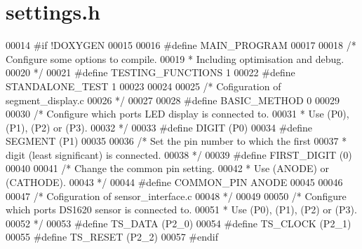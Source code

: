 \section{settings.h}

\begin{DoxyCode}
00014 \textcolor{preprocessor}{#if !DOXYGEN}
00015 \textcolor{preprocessor}{}
00016 \textcolor{preprocessor}{#define MAIN\_PROGRAM}
00017 \textcolor{preprocessor}{}
00018 \textcolor{comment}{/* Configure some options to compile.}
00019 \textcolor{comment}{ * Including optimisation and debug.}
00020 \textcolor{comment}{*/}
00021 \textcolor{preprocessor}{#define TESTING\_FUNCTIONS       1}
00022 \textcolor{preprocessor}{}\textcolor{preprocessor}{#define STANDALONE\_TEST         1}
00023 \textcolor{preprocessor}{}
00024 
00025 \textcolor{comment}{/* Cofiguration of segment\_display.c}
00026 \textcolor{comment}{*/}
00027 
00028 \textcolor{preprocessor}{#define BASIC\_METHOD            0}
00029 \textcolor{preprocessor}{}
00030 \textcolor{comment}{/* Configure which ports LED display is connected to.}
00031 \textcolor{comment}{ * Use (P0), (P1), (P2) or (P3).}
00032 \textcolor{comment}{*/}
00033 \textcolor{preprocessor}{#define DIGIT           (P0)}
00034 \textcolor{preprocessor}{}\textcolor{preprocessor}{#define SEGMENT         (P1)}
00035 \textcolor{preprocessor}{}
00036 \textcolor{comment}{/* Set the pin number to which the first}
00037 \textcolor{comment}{ * digit (least significant) is connected.}
00038 \textcolor{comment}{*/}
00039 \textcolor{preprocessor}{#define FIRST\_DIGIT             (0)}
00040 \textcolor{preprocessor}{}
00041 \textcolor{comment}{/* Change the common pin setting.}
00042 \textcolor{comment}{ * Use (ANODE) or (CATHODE).}
00043 \textcolor{comment}{*/}
00044 \textcolor{preprocessor}{#define COMMON\_PIN              ANODE}
00045 \textcolor{preprocessor}{}
00046 
00047 \textcolor{comment}{/* Cofiguration of sensor\_interface.c}
00048 \textcolor{comment}{*/}
00049 
00050 \textcolor{comment}{/* Configure which ports DS1620 sensor is connected to.}
00051 \textcolor{comment}{ * Use (P0), (P1), (P2) or (P3).}
00052 \textcolor{comment}{*/}
00053 \textcolor{preprocessor}{#define TS\_DATA         (P2\_0)}
00054 \textcolor{preprocessor}{}\textcolor{preprocessor}{#define TS\_CLOCK        (P2\_1)}
00055 \textcolor{preprocessor}{}\textcolor{preprocessor}{#define TS\_RESET        (P2\_2)}
00057 \textcolor{preprocessor}{#endif}
\end{DoxyCode}
